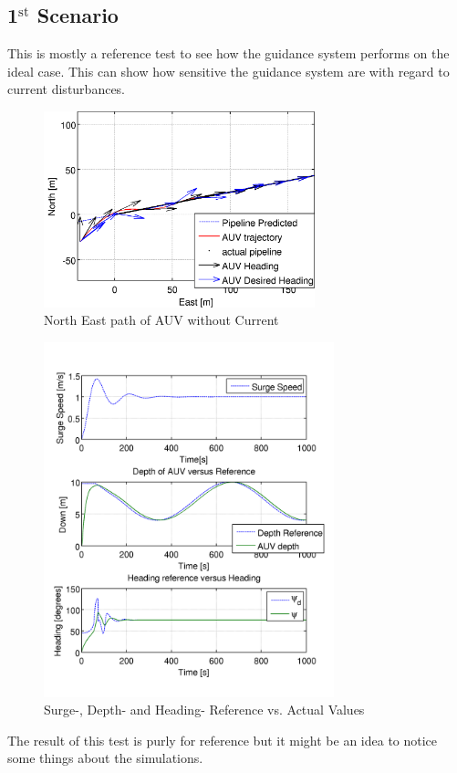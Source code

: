 	\subsection{1$^{\mathrm{st}}$ Scenario}
		This is mostly a reference test to see how the guidance system performs on the ideal case.
		This can show how sensitive the guidance system are with regard to current disturbances.
		\begin{figure}[htbp]
			\centering
			\includegraphics[width=0.7\textwidth]{pics/1st_NE_path}
			\caption{North East path of AUV without Current}
			\label{fig:ch3_1st_NE_path}
		\end{figure}
		\begin{figure}[htbp]
			\centering
			\includegraphics[width=0.75\textwidth]{pics/1st_uDpsi}
			\caption{Surge-, Depth- and Heading- Reference vs. Actual Values}
			\label{fig:ch3_1st_uDpsi}
		\end{figure}
		The result of this test is purly for reference but it might be an idea to notice some things
		about the simulations. 
		

